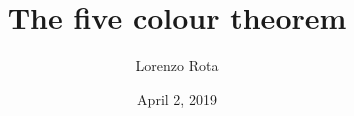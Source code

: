 \documentclass[12pt, a4paper, openany]{article}
\title{The five colour theorem}
\author{Lorenzo Rota}
\date{April 2, 2019}
\begin{document}





\nocite{*}
\pagebreak
\printbibliography
\end{document}
